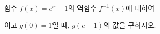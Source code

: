 함수 $f(x)=e^x-1$의 역함수 $f^{-1}(x)$에 대하여 \par\smallskip{}\par\smallskip\noindent 이고 $g(0)=1$일 때, $g(e-1)$의 값을 구하시오.
